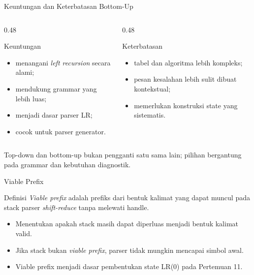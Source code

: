 \documentclass[aspectratio=169,10pt,t]{beamer}
\begin{document}
\begin{frame}{Keuntungan dan Keterbatasan Bottom-Up}
  \begin{columns}[T,onlytextwidth]
    \begin{column}{0.48\textwidth}
      \begin{block}{Keuntungan}
        \footnotesize
        \begin{itemize}
          \item menangani \textit{left recursion} secara alami;
          \item mendukung grammar yang lebih luas;
          \item menjadi dasar parser LR;
          \item cocok untuk parser generator.
        \end{itemize}
      \end{block}
    \end{column}
    \begin{column}{0.48\textwidth}
      \begin{block}{Keterbatasan}
        \footnotesize
        \begin{itemize}
          \item tabel dan algoritma lebih kompleks;
          \item pesan kesalahan lebih sulit dibuat kontekstual;
          \item memerlukan konstruksi state yang sistematis.
        \end{itemize}
      \end{block}
    \end{column}
  \end{columns}

  \vspace{4pt}
  {\footnotesize\color{ubbblue!80}Top-down dan bottom-up bukan
  pengganti satu sama lain; pilihan bergantung pada grammar dan
  kebutuhan diagnostik.}
\end{frame}

\begin{frame}{Viable Prefix}
  \begin{block}{Definisi}
    \small
    \textit{Viable prefix} adalah prefiks dari bentuk kalimat yang
    dapat muncul pada stack parser \textit{shift-reduce} tanpa melewati
    handle.
  \end{block}

  \begin{itemize}
    \item Menentukan apakah stack masih dapat diperluas menjadi bentuk
          kalimat valid.
    \item Jika stack bukan \textit{viable prefix}, parser tidak mungkin
          mencapai simbol awal.
    \item Viable prefix menjadi dasar pembentukan state LR(0) pada
          Pertemuan 11.
  \end{itemize}
\end{frame}
\end{document}
